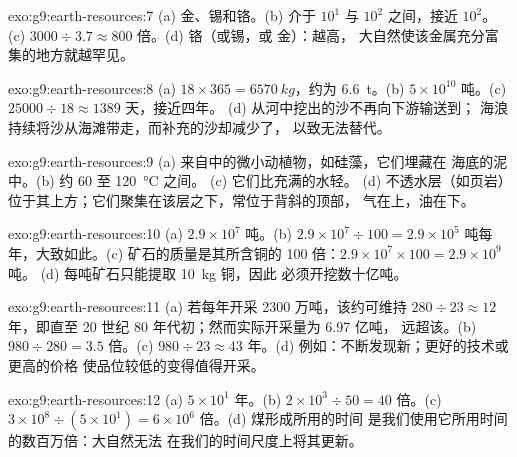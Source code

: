 \begin{solution}{exo:g9:earth-resources:7}
(a) 金、锡和铬。(b) 介于 $10^1$ 与 $10^2$ 之间，接近
$10^2$。(c) $3000 \div 3.7 \approx 800$ 倍。(d) 铬（或锡，或
金）：越高，
大自然使该金属充分富集的地方就越罕见。
\end{solution}

\begin{solution}{exo:g9:earth-resources:8}
(a) $18 \times 365 = \qty{6570}{kg}$，约为 \qty{6.6}{t}。(b) $5 \times
10^{10}$ 吨。(c) $25000 \div 18 \approx 1389$ 天，接近四年。
(d) 从河中挖出的沙不再向下游输送到；
海浪持续将沙从海滩带走，而补充的沙却减少了，
以致无法替代。
\end{solution}

\begin{solution}{exo:g9:earth-resources:9}
(a) 来自中的微小动植物，如硅藻，它们埋藏在
海底的泥中。(b) 约 60 至 \qty{120}{\degreeCelsius} 之间。
(c) 它们比充满的水轻。
(d) 不透水层（如页岩）位于其上方；它们聚集在该层之下，常位于背斜的顶部，
气在上，油在下。
\end{solution}

\begin{solution}{exo:g9:earth-resources:10}
(a) $2.9 \times 10^7$ 吨。(b) $2.9 \times 10^7 \div 100 = 2.9 \times
10^5$ 吨每年，大致如此。(c) 矿石的质量是其所含铜的
100 倍：$2.9 \times 10^7 \times 100 = 2.9 \times 10^9$ 吨。
(d) 每吨矿石只能提取 \qty{10}{kg} 铜，因此
必须开挖数十亿吨。
\end{solution}

\begin{solution}{exo:g9:earth-resources:11}
(a) 若每年开采 2300 万吨，该约可维持 $280 \div 23
\approx 12$ 年，即直至 20 世纪 80 年代初；然而实际开采量为 6.97 亿吨，
远超该。(b) $980 \div 280 = 3.5$ 倍。(c) $980 \div
23 \approx 43$ 年。(d) 例如：不断发现新；更好的技术或更高的价格
使品位较低的变得值得开采。
\end{solution}

\begin{solution}{exo:g9:earth-resources:12}
(a) $5 \times 10^1$ 年。(b) $2 \times 10^3 \div 50 = 40$ 倍。(c) $3
\times 10^8 \div (5 \times 10^1) = 6 \times 10^6$ 倍。(d) 煤形成所用的时间
是我们使用它所用时间的数百万倍：大自然无法
在我们的时间尺度上将其更新。
\end{solution}

